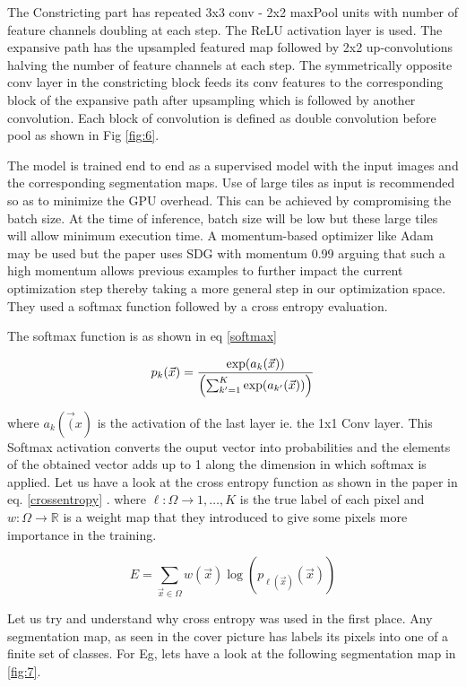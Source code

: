 \documentclass[19pt]{article}
\begin{document}
The Constricting part has repeated 3x3 conv - 2x2 maxPool units with number of feature channels doubling at each step. The ReLU activation layer is used. The expansive path has the upsampled featured map followed by 2x2 up-convolutions halving the number of feature channels at each step. The symmetrically opposite conv layer in the constricting block feeds its conv features to the corresponding block of the expansive path after upsampling which is followed by another convolution. Each block of convolution is defined as double convolution before pool as shown in Fig \ref{fig:6}.

The model is trained end to end as a supervised model with the input images and the corresponding segmentation maps. Use of large tiles as input is recommended so as to minimize the GPU overhead. This can be achieved by compromising the batch size. At the time of inference, batch size will be low but these large tiles will allow minimum execution time. A momentum-based optimizer like Adam may be used but the paper uses SDG with momentum 0.99 arguing that such a high momentum allows previous examples to further impact the current optimization step thereby taking a more general step in our optimization space. They used a softmax function followed by a cross entropy evaluation. 

The softmax function is as shown in eq \ref{softmax}

\begin{equation}
    \label{softmax}
        {p}_k(\vec{x}) = {\exp({a_k(\vec{x})}) \over \left(\sum_{k' =     1}^K \exp(a_{k'}(\vec{x}))\right)}
\end{equation}

where $a_k(\vec(x)$ is the activation of the last layer ie. the 1x1 Conv layer. This Softmax activation converts the ouput vector into probabilities and the elements of the obtained vector adds up to 1 along the dimension in which softmax is applied. Let us have a look at the cross entropy function as shown in the paper in eq. \ref{crossentropy} .
where $ \ell:\Omega \rightarrow {1,\dots,K} $ is the true label of each pixel and $ w:\Omega \rightarrow \mathbb{R} $  is a weight map that they introduced to give some pixels more importance in the training.

\begin{equation} 
    \label{crossentropy} 
        E = \sum_{\vec{x} \in \Omega} w(\vec{x}) \log({p}_{\ell(\vec{x})}(\vec{x}))  
\end{equation}

Let us try and understand why cross entropy was used in the first place. Any segmentation map, as seen in the cover picture has labels its pixels into one of a finite set of classes. For Eg, lets have a look at the following segmentation map in \ref{fig:7}.
\end{document}
